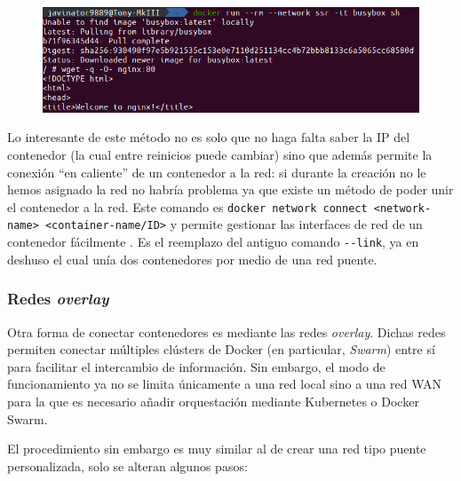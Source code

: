 \begin{enumerate}
          \begin{figure}[H]
              \centering
              \includegraphics[width=.9\linewidth]{pictures/nginx-wget.png}
          \end{figure}
\end{enumerate}

Lo interesante de este método no es solo que no haga falta saber la IP del contenedor
(la cual entre reinicios puede cambiar) sino que además permite la conexión ``en caliente''
de un contenedor a la red: si durante la creación no le hemos asignado la red no habría
problema ya que existe un método de poder unir el contenedor a la red. Este comando
es \lstinline[style=bash]!docker network connect <network-name> <container-name/ID>!
y permite gestionar las interfaces de red de un contenedor fácilmente \cite{DockerNetworkConnect2021}.
Es el reemplazo del antiguo comando \texttt{-{}-link}, ya en deshuso \cite{LegacyContainerLinks2021}
el cual unía dos contenedores por medio de una red puente.

\subsubsection*{Redes \textit{overlay}}
Otra forma de conectar contenedores es mediante las redes \textit{overlay}. 
Dichas redes permiten conectar múltiples clústers de Docker (en particular, \textit{Swarm})
entre sí para facilitar el intercambio de información. Sin embargo, el modo de
funcionamiento ya no se limita únicamente a una red local sino a una red WAN para la
que es necesario añadir orquestación mediante Kubernetes o Docker Swarm.

El procedimiento sin embargo es muy similar al de crear una red tipo puente personalizada,
solo se alteran algunos pasos:

